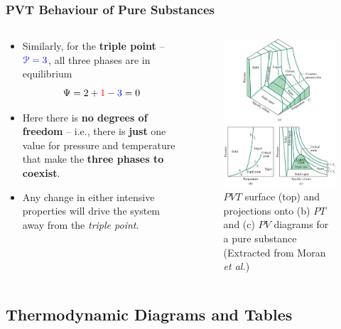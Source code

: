 \documentclass[10pt,compress,handout,ignorenonframetext]{beamer}
\begin{document}
\begin{frame}
 \frametitle{PVT Behaviour of Pure Substances}
 \begin{columns}
  \begin{column}[l]{0.5\linewidth}
\begin{itemize}
\item <1-> Similarly, for the {\bf triple point} -- $\textcolor{blue}{\mathcal{P}=3}$, all three phases are in equilibrium
\begin{displaymath}
\Psi = 2 + \textcolor{red}{1} - \textcolor{blue}{3} = 0
\end{displaymath}
\item <2-> Here there is {\bf no degrees of freedom} -- i.e., there is {\bf just} one value for pressure and temperature that make the {\bf three phases to coexist}.
\item <3-> Any change in either intensive properties will drive the system away from the {\it triple point}.
\end{itemize}
  \end{column}
  \begin{column}[l]{0.5\linewidth}
   \begin{figure}%
    \begin{center}
     \includegraphics[width=4.cm,clip]{./Pics/PVT_Surface.jpg}
    \end{center}
\caption{$PVT$ surface (top) and projections onto (b) $PT$ and (c) $PV$ diagrams for a pure substance (Extracted from Moran {\it et al.})}
   \end{figure}    
  \end{column}
 \end{columns}
\end{frame}



\subsection{Thermodynamic Diagrams and Tables}
\end{document}
